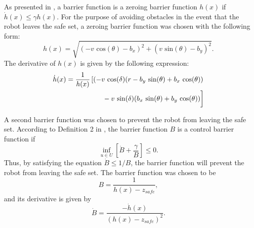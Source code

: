 \documentclass[conference]{IEEEtran}
\begin{document}
As presented in \cite{ames2015robust}, a barrier function is a zeroing barrier function $h(x)$ if $\dot{h}(x)\leq \gamma h(x).$ For the purpose of avoiding obstacles in the event that the robot leaves the safe set, a zeroing barrier function was chosen with the following form:
\begin{equation}
h(x)=\sqrt{(-v\text{ cos}(\theta)-b_x)^2+(v\text{ sin}(\theta)-b_y)^2}.
\end{equation}
The derivative of $h(x)$ is given by the following expression:
\begin{equation}
\begin{split}
\dot{h}(x)=\frac{1}{h(x)} \left[ (-v\text{ cos}(\delta)(r-b_y\text{ sin}(\theta)+b_x\text{ cos}(\theta)) \right. \\
\left. \vphantom{\frac{1}{h(x)}}-v\text{ sin}(\delta)(b_x\text{ sin}(\theta)+b_y\text{ cos}(\theta))\right]
\end{split}
\label{zbf}
\end{equation}

A second barrier function was chosen to prevent the robot from leaving the safe set. According to Definition 2 in \cite{amesACC}, the barrier function $B$ is a control barrier function if 
\begin{equation}
\inf_{u\in U}\left[ \dot{B}+\frac{\gamma}{B} \right] \leq 0.
\label{eq:cbf}
\end{equation}
Thus, by satisfying the equation $\dot{B}\leq 1/B$, the barrier function will prevent the robot from leaving the safe set. The barrier function was chosen to be
\begin{equation}
B=\frac{1}{h(x)-z_{safe}},
\label{bf}
\end{equation}
and its derivative is given by
\begin{equation}
\dot{B}=\frac{-\dot{h}(x)}{(h(x)-z_{safe})^2}.
\end{equation}

\end{document}
